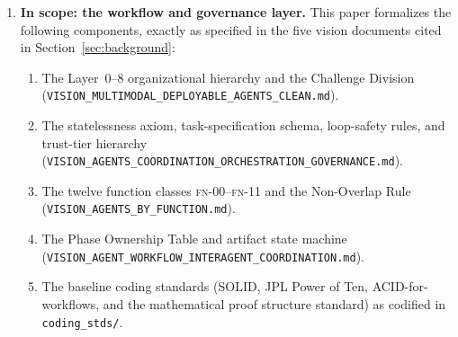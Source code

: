 \documentclass[12pt]{article}
\theoremstyle{definition}
\newcommand{\code}[1]{\texttt{#1}}
\newcommand{\FN}[1]{\textsc{fn-#1}}
\newcommand{\VisionClean}{\code{VISION\_MULTIMODAL\_\allowbreak DEPLOYABLE\_\allowbreak AGENTS\_CLEAN.md}}
\newcommand{\VisionGov}{\code{VISION\_AGENTS\_\allowbreak COORDINATION\_\allowbreak ORCHESTRATION\_\allowbreak GOVERNANCE.md}}
\newcommand{\VisionFunc}{\code{VISION\_AGENTS\_\allowbreak BY\_FUNCTION.md}}
\newcommand{\VisionFlow}{\code{VISION\_AGENT\_\allowbreak WORKFLOW\_\allowbreak INTERAGENT\_\allowbreak COORDINATION.md}}
\begin{document}
\begin{enumerate}

    \item \textbf{In scope: the workflow and governance layer.}
          This paper formalizes the following components, exactly as
          specified in the five vision documents cited in
          Section~\ref{sec:background}:
          \begin{enumerate}
              \item[S1.] The Layer~0--8 organizational hierarchy and
                         the Challenge Division (\VisionClean{}).
              \item[S2.] The statelessness axiom, task-specification
                         schema, loop-safety rules, and trust-tier
                         hierarchy (\VisionGov{}).
              \item[S3.] The twelve function classes \FN{00}--\FN{11}
                         and the Non-Overlap Rule (\VisionFunc{}).
              \item[S4.] The Phase Ownership Table and artifact state
                         machine (\VisionFlow{}).
              \item[S5.] The baseline coding standards (SOLID, JPL Power
                         of Ten, ACID-for-workflows, and the mathematical
                         proof structure standard) as codified in
                         \code{coding\_stds/}.
          \end{enumerate}


\end{enumerate}
\end{document}
